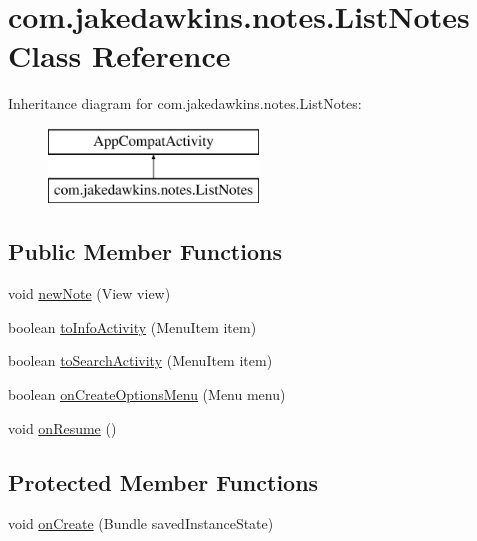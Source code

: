 \hypertarget{classcom_1_1jakedawkins_1_1notes_1_1_list_notes}{}\section{com.\+jakedawkins.\+notes.\+List\+Notes Class Reference}
\label{classcom_1_1jakedawkins_1_1notes_1_1_list_notes}
Inheritance diagram for com.\+jakedawkins.\+notes.\+List\+Notes\+:\begin{figure}[H]
\begin{center}
\leavevmode
\includegraphics[height=2.000000cm]{classcom_1_1jakedawkins_1_1notes_1_1_list_notes}
\end{center}
\end{figure}
\subsection*{Public Member Functions}
\begin{DoxyCompactItemize}
\item 
void \hyperlink{classcom_1_1jakedawkins_1_1notes_1_1_list_notes_a18e83462a551ec45bde3a6040267fdc8}{new\+Note} (View view)
\item 
boolean \hyperlink{classcom_1_1jakedawkins_1_1notes_1_1_list_notes_a6b4df66f8083efa67bae77294b2c6a6b}{to\+Info\+Activity} (Menu\+Item item)
\item 
boolean \hyperlink{classcom_1_1jakedawkins_1_1notes_1_1_list_notes_a013f2dd604c69ac335dd0b2e3d95e2ed}{to\+Search\+Activity} (Menu\+Item item)
\item 
boolean \hyperlink{classcom_1_1jakedawkins_1_1notes_1_1_list_notes_ac97485ae407d36a55b0c2994bbaaa228}{on\+Create\+Options\+Menu} (Menu menu)
\item 
void \hyperlink{classcom_1_1jakedawkins_1_1notes_1_1_list_notes_a78c2ab7f4a94ab8efbe36b1c9be81b60}{on\+Resume} ()
\end{DoxyCompactItemize}
\subsection*{Protected Member Functions}
\begin{DoxyCompactItemize}
\item 
void \hyperlink{classcom_1_1jakedawkins_1_1notes_1_1_list_notes_a39a41b19881da4d8ac90ac3bacbf95a1}{on\+Create} (Bundle saved\+Instance\+State)
\end{DoxyCompactItemize}


